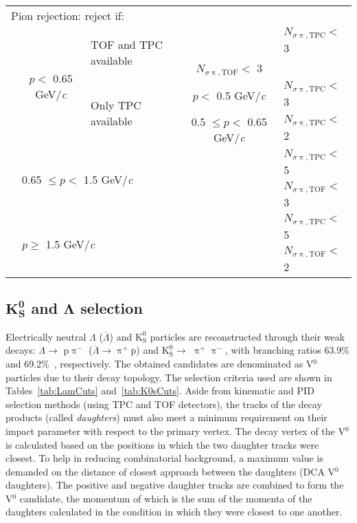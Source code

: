 \documentclass[ALICE,manyauthors]{cernphprep}
\newcommand{\Lam}{$\Lambda$\xspace}
\newcommand{\ALam}{$\overline{\Lambda}$\xspace}
\newcommand{\LamALam}{$\Lambda$ ($\overline{\Lambda}$)\xspace}
\newcommand{\Kpm}{$\mathrm{K^{\pm}}$\xspace}
\newcommand{\Ks}{$\mathrm{K^{0}_{S}}$\xspace}
\newcommand{\Vz}{V$^{0}$\xspace}
\begin{document}
\begin{table}[htbp]
\begin{tabular}{lcc|c|l}
   \multicolumn{5}{l}{Pion rejection:  reject if:} \\
   \cline{2-5}
   \multirow{4}{*}{} & \multirow{4}{*}{$p <$ 0.65 GeV/\textit{c}} & \multicolumn{1}{l}{\multirow{2}{*}{TOF and TPC available}} & \multicolumn{1}{c|}{} & $N_{\sigma \uppi,\mathrm{TPC}} <$ 3 \\
   \multicolumn{4}{c|}{} & $N_{\sigma \uppi,\mathrm{TOF}} <$ 3 \\
   \cline{3-5}
   \multicolumn{2}{c}{} & \multicolumn{1}{l|}{\multirow{2}{*}{Only TPC available}} & $p <$ 0.5 GeV/\textit{c} & $N_{\sigma \uppi,\mathrm{TPC}} <$ 3 \\
   \cline{4-5}
   \multicolumn{3}{c|}{} & 0.5 $\leq p <$ 0.65 GeV/\textit{c} & $N_{\sigma \uppi,\mathrm{TPC}} <$ 2 \\
   \cline{2-5}
    & \multicolumn{3}{l|}{\multirow{2}{*}{0.65 $\leq p <$ 1.5 GeV/\textit{c}}} & $N_{\sigma \uppi,\mathrm{TPC}} <$ 5 \\
    \multicolumn{4}{c|}{} & $N_{\sigma \uppi,\mathrm{TOF}} <$ 3 \\
   \cline{2-5}
    & \multicolumn{3}{l|}{\multirow{2}{*}{$p \geq$ 1.5 GeV/\textit{c}}} & $N_{\sigma \uppi,\mathrm{TPC}} <$ 5 \\
    \multicolumn{4}{c|}{} & $N_{\sigma \uppi,\mathrm{TOF}} <$ 2 \\
   \hline
  \end{tabular}
 \label{tab:KchCuts} 
\end{table}


\subsection{$\mathbf{K^{0}_{S}}$ and $\boldsymbol{\Lambda}$ selection}
\label{sec:V0Selection}

Electrically neutral \LamALam and \Ks particles are reconstructed through their weak decays: \Lam $\rightarrow$ p$\uppi^{-}$ (\ALam $\rightarrow \uppi^{+}\overline{\mathrm{p}}$) and \Ks $\rightarrow$ $\uppi^{+}\uppi^{-}$, with branching ratios 63.9\% and 69.2\%~\cite{PhysRevD.98.030001}, respectively.
The obtained candidates are denominated as \Vz particles due to their decay topology.
The selection criteria used are shown in Tables~\ref{tab:LamCuts} and~\ref{tab:K0sCuts}.
Aside from kinematic and PID selection methods (using TPC and TOF detectors), the tracks of the decay products (called \textit{daughters}) must also meet a minimum requirement on their impact parameter with respect to the primary vertex.  
The decay vertex of the \Vz is calculated based on the positions in which the two daughter tracks were closest.
To help in reducing combinatorial background, a maximum value is demanded on the distance of closest approach between the daughters (DCA \Vz daughters).
The positive and negative daughter tracks are combined to form the \Vz candidate, the momentum of which is the sum of the momenta of the daughters calculated in the condition in which they were closest to one another.
\end{document}
